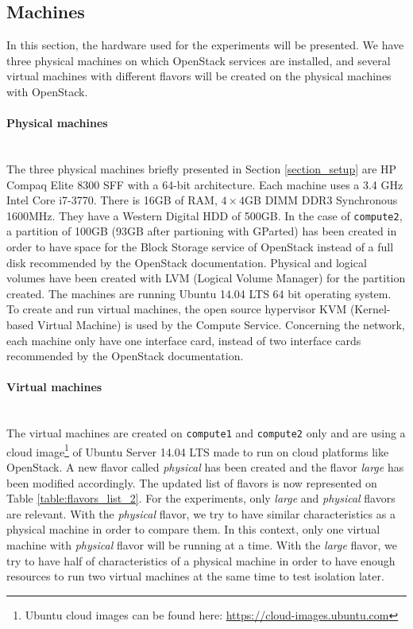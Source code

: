 \subsection{Machines}
In this section, the hardware used for the experiments will be presented. We have three physical machines on which OpenStack services are installed, and several virtual machines with different flavors will be created on the physical machines with OpenStack.


\paragraph{Physical machines}\mbox{}\\
The three physical machines briefly presented in Section \ref{section_setup} are HP Compaq Elite 8300 SFF with a 64-bit architecture. 
Each machine uses a 3.4 GHz Intel Core i7-3770. 
There is 16GB of RAM, $4\times4$GB DIMM DDR3 Synchronous 1600MHz. 
They have a Western Digital HDD of 500GB. 
In the case of \texttt{compute2}, a partition of 100GB (93GB after partioning with GParted) has been created in order to have space for the Block Storage service of OpenStack instead of a full disk recommended by the OpenStack documentation. 
Physical and logical volumes have been created with LVM (Logical Volume Manager) for the partition created.
The machines are running Ubuntu 14.04 LTS 64 bit operating system. 
To create and run virtual machines, the open source hypervisor KVM (Kernel-based Virtual Machine) is used by the Compute Service. Concerning the network, each machine only have one interface card, instead of two interface cards recommended by the OpenStack documentation.



\paragraph{Virtual machines}\mbox{}\\
The virtual machines are created on \texttt{compute1} and \texttt{compute2} only and are using a cloud image\footnote{Ubuntu cloud images can be found here: \url{https://cloud-images.ubuntu.com}} of Ubuntu Server 14.04 LTS made to run on cloud platforms like OpenStack. 
A new flavor called \textit{physical} has been created and the flavor \textit{large} has been modified accordingly. 
The updated list of flavors is now represented on Table \ref{table:flavors_list_2}. 
For the experiments, only \textit{large} and \textit{physical} flavors are relevant. 
With the \textit{physical} flavor, we try to have similar characteristics as a physical machine in order to compare them. 
In this context, only one virtual machine with \textit{physical} flavor will be running at a time. 
With the \textit{large} flavor, we try to have half of characteristics of a physical machine in order to have enough resources to run two virtual machines at the same time to test isolation later.

